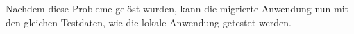 Nachdem diese Probleme gelöst wurden, kann die migrierte Anwendung nun mit den gleichen Testdaten, wie die lokale Anwendung getestet werden.



